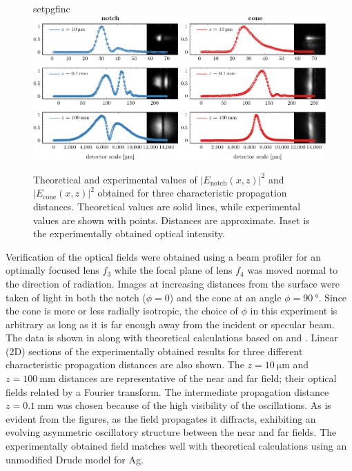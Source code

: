 \begin{figure}[ht]
 \centering
 {setpgfinc}
 \includegraphics[width=16cm,keepaspectratio]{interference/figures/fig2-crop.pdf}
	\caption{ Theoretical and experimental values of
$|E_\text{notch}(x,z)|^2$ and $|E_\text{cone}(x,z)|^2$ obtained for three
characteristic propagation distances.  Theoretical values are solid lines,
while experimental values are shown with points.  Distances are
approximate.  Inset is the experimentally obtained optical intensity.}
 \label{fig:fresnelprop}
\end{figure}
Verification of the optical fields were obtained using a beam profiler for
an optimally focused lens $f_3$ while the focal plane of lens $f_4$ was moved normal
to the direction of radiation.  Images at increasing distances from the
surface were taken of light in both the notch
($\phi=0$) and the cone at an angle $\phi = \SI{90}{\degree}$.  Since the
cone is more or less radially isotropic, the choice of $\phi$ in this
experiment is arbitrary as long as it is far enough away from the incident
or specular beam.  The data is shown in  along with 
theoretical calculations based on  and
. Linear (2D) sections of the experimentally obtained results for
three different characteristic propagation distances are also shown.  
The $z=\SI{10}{\micro\meter}$ and $z=\SI{100}{\milli\meter}$ distances
are representative of the near and far field; their optical fields 
related by a Fourier transform.  The intermediate propagation
distance $z=\SI{0.1}{\milli\meter}$ was chosen because of the high visibility of the oscillations.  As is evident from the figures, as the field propagates it
diffracts, exhibiting an evolving asymmetric oscillatory structure between
the near and far fields.  The experimentally obtained field matches well with
theoretical calculations using an unmodified Drude model for Ag.

